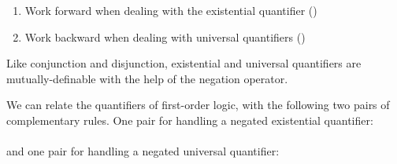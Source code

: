 \begin{enumerate}
\item Work forward when dealing with the existential quantifier (\eexists)
\item Work backward when dealing with universal quantifiers (\eforall)
\end{enumerate}



Like conjunction and disjunction, existential and universal quantifiers are
mutually-definable with the help of the negation operator.

\begin{fitchrule}
  \label{def:quantifier-conversion-rule}
  We can relate the quantifiers of first-order logic, with the following two
  pairs of complementary rules. One pair for handling a negated existential
  quantifier:\\
  \leavevmode
  \\
  and one pair for handling a negated universal quantifier: \\
\end{fitchrule}


